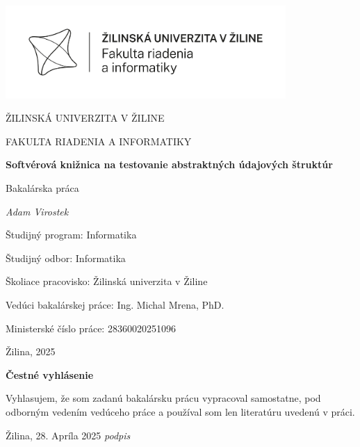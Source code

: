 \documentclass[11pt]{article}
\begin{document}
\begin{titlepage}
  \centering
  \parskip=0pt

  \includegraphics[width=0.8\textwidth]{university-logo.png}
  \vspace{1cm}

  {\LARGE ŽILINSKÁ UNIVERZITA V ŽILINE\par}
  \vspace{0.5cm}
  {\Large FAKULTA RIADENIA A INFORMATIKY\par}
  \vspace{1.5cm}
  {\huge\bfseries Softvérová knižnica na testovanie abstraktných údajových štruktúr\par}
  \vspace{1cm}
  {\Large Bakalárska práca\par}
  \vspace{1.5cm}
  {\Large\itshape Adam Virostek\par}

  \vfill

  \begin{flushleft}
  Študijný program: Informatika\par
  Študijný odbor: Informatika\par
  Školiace pracovisko: Žilinská univerzita v Žiline\par
  Vedúci bakalárskej práce: Ing. Michal Mrena, PhD.\par
  Ministerské číslo práce: 28360020251096\par
  Žilina, 2025
  \end{flushleft}
\end{titlepage}



\newpage

\vspace*{\fill}
\begin{flushleft}
  \Large\bfseries Čestné vyhlásenie
\end{flushleft}
\vspace{0.5cm}
\noindent Vyhlasujem, že som zadanú bakalársku prácu vypracoval samostatne, pod odborným vedením vedúceho práce a používal som len literatúru uvedenú v práci.\par
\vspace{1cm}
\noindent Žilina, 28. Apríla 2025 \hfill \textit{podpis}
\end{document}
